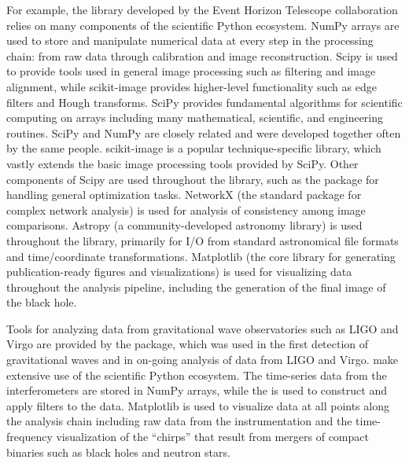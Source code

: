 For example, the  library developed by the Event Horizon Telescope 
collaboration relies on many components of the scientific Python ecosystem.
NumPy arrays are used to store and manipulate numerical data at every step
in the processing chain: from raw data through calibration and image 
reconstruction.
Scipy is used to provide tools used in general image processing such as 
filtering and image alignment, while scikit-image provides higher-level
functionality such as edge filters and Hough transforms.
SciPy provides fundamental algorithms for scientific computing on arrays
including many mathematical, scientific, and engineering routines.
SciPy and NumPy are closely related and were developed together often
by the same people.
scikit-image is a popular technique-specific library,
which vastly extends the basic image processing tools provided by SciPy.
Other components of Scipy are used throughout the library, such as the
 package for handling general optimization tasks.
NetworkX \cite{SciPyProceedings_11} (the standard package for complex
network analysis) is used for analysis of consistency among image
comparisons.
Astropy \cite{astropy:2013, astropy:2018} (a community-developed astronomy
library) is used throughout the library,
primarily for I/O from standard astronomical file formats and time/coordinate
transformations.
Matplotlib (the core library for generating publication-ready figures
and visualizations) is used for visualizing data throughout the analysis pipeline,
including the generation of the final image of the black hole.

Tools for analyzing data from gravitational wave observatories such as LIGO
and Virgo are provided by the  package, which was used in the first
detection of gravitational waves \cite{abbott2016observation} and in 
on-going analysis of data from LIGO and Virgo.
 make extensive use of the scientific Python ecosystem.
The time-series data from the interferometers are stored in NumPy arrays,
while the  is used to construct and apply filters to the
data.
Matplotlib is used to visualize data at all points along the analysis chain
including raw data from the instrumentation and the time-frequency 
visualization of the ``chirps'' that result from mergers of compact binaries
such as black holes\cite{abbott2016observation} and
neutron stars\cite{abbott2017multi}.

